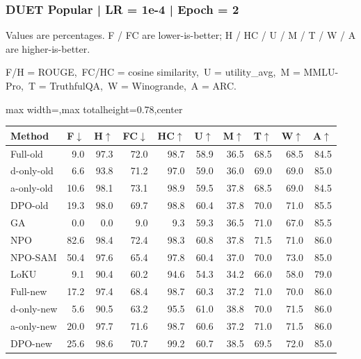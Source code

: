 \documentclass[aspectratio=169,11pt]{beamer}
\begin{document}
\begin{frame}[t]
\frametitle{DUET Popular | LR = 1e-4 | Epoch = 2}
{\tiny Values are percentages. F / FC are lower-is-better; H / HC / U / M / T / W / A are higher-is-better.}

{\tiny F/H = ROUGE,\ FC/HC = cosine similarity,\ U = utility\_avg,\ M = MMLU-Pro,\ T = TruthfulQA,\ W = Winogrande,\ A = ARC.}

\vspace{0.35em}
\centering
\scriptsize
\setlength{\tabcolsep}{3.6pt}
\renewcommand{\arraystretch}{1.05}
\begin{adjustbox}{max width=\textwidth,max totalheight=0.78\textheight,center}
\begin{tabular}{l*{9}{r}}
\toprule
Method & F$\downarrow$ & H$\uparrow$ & FC$\downarrow$ & HC$\uparrow$ & U$\uparrow$ & M$\uparrow$ & T$\uparrow$ & W$\uparrow$ & A$\uparrow$ \\
\midrule
\rowcolor{blue!10}
Full-old & 9.0 & 97.3 & 72.0 & 98.7 & 58.9 & 36.5 & 68.5 & 68.5 & 84.5 \\
\rowcolor{orange!10}
d-only-old & 6.6 & 93.8 & 71.2 & 97.0 & 59.0 & 36.0 & 69.0 & 69.0 & 85.0 \\
\rowcolor{green!10}
a-only-old & 10.6 & 98.1 & 73.1 & 98.9 & 59.5 & 37.8 & 68.5 & 69.0 & 84.5 \\
\rowcolor{gray!8}
DPO-old & 19.3 & 98.0 & 69.7 & 98.8 & 60.4 & 37.8 & 70.0 & 71.0 & 85.5 \\
\rowcolor{gray!8}
GA & 0.0 & 0.0 & 9.0 & 9.3 & 59.3 & 36.5 & 71.0 & 67.0 & 85.5 \\
\rowcolor{gray!8}
NPO & 82.6 & 98.4 & 72.4 & 98.3 & 60.8 & 37.8 & 71.5 & 71.0 & 86.0 \\
\rowcolor{gray!8}
NPO-SAM & 50.4 & 97.6 & 65.4 & 97.8 & 60.4 & 37.0 & 70.0 & 73.0 & 85.0 \\
\rowcolor{gray!8}
LoKU & 9.1 & 90.4 & 60.2 & 94.6 & 54.3 & 34.2 & 66.0 & 58.0 & 79.0 \\
\rowcolor{blue!20}
Full-new & 17.2 & 97.4 & 68.4 & 98.7 & 60.3 & 37.2 & 71.0 & 70.0 & 86.0 \\
\rowcolor{orange!20}
d-only-new & 5.6 & 90.5 & 63.2 & 95.5 & 61.0 & 38.8 & 70.0 & 71.5 & 86.0 \\
\rowcolor{green!20}
a-only-new & 20.0 & 97.7 & 71.6 & 98.7 & 60.6 & 37.2 & 71.0 & 71.5 & 86.0 \\
\rowcolor{gray!15}
DPO-new & 25.6 & 98.6 & 70.7 & 99.2 & 60.7 & 38.5 & 69.5 & 72.0 & 85.0 \\
\bottomrule
\end{tabular}
\end{adjustbox}
\end{frame}
\end{document}
